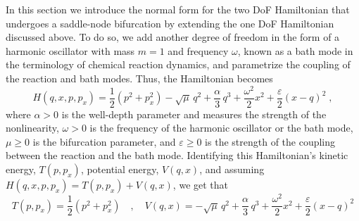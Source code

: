 \documentclass{ws-ijbc}
\begin{document}
In this section we introduce the normal form for the two DoF Hamiltonian that undergoes a saddle-node bifurcation by extending the one DoF Hamiltonian discussed above. To do so, we add another degree of freedom in the form of a harmonic oscillator with mass $m = 1$ and frequency $\omega$, known as a bath mode in the terminology of chemical reaction dynamics, and parametrize the coupling of the reaction and bath modes. Thus, the Hamiltonian becomes 
\begin{equation}
H(q,x,p,p_x) = \dfrac{1}{2} \left(p^2 + p_x^2 \right) - \sqrt{\mu} \, q^2 + \frac{\alpha}{3} \,q^3 + \dfrac{\omega^2}{2} x^2 + \dfrac{\varepsilon}{2} \left(x-q\right)^2 \; ,
\label{ham_2dof}
\end{equation}
where $\alpha > 0$ is the well-depth parameter and measures the strength of the nonlinearity, $\omega > 0$ is the frequency of the harmonic oscillator or the bath mode, $\mu \geq 0$ is the bifurcation parameter, and $\varepsilon \geqslant 0$ is the strength of the coupling between the reaction and the bath mode. Identifying this Hamiltonian's kinetic energy, $T(p,p_x)$, potential energy, $V(q,x)$, and assuming $H(q,x,p,p_x) = T(p,p_x) + V(q,x)$, we get that
\begin{equation}
T(p,p_x) = \frac{1}{2}\left(p^2 + p_x^2\right)  \quad,\quad V(q,x) = - \sqrt{\mu} \, q^2 + \frac{\alpha}{3} \,q^3 + \dfrac{\omega^2}{2} x^2 + \dfrac{\varepsilon}{2} \left(x-q\right)^2
\label{pes_2dof}
\end{equation}
\end{document}
